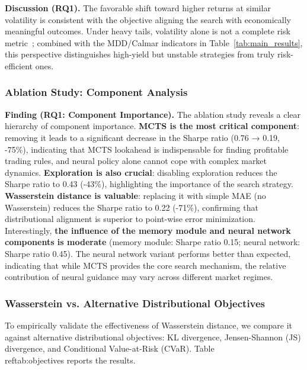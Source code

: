 \textbf{Discussion (RQ1).} The favorable shift toward higher returns at similar volatility is consistent with the objective aligning the search with economically meaningful outcomes. Under heavy tails, volatility alone is not a complete risk metric~\cite{cont2001empirical}; combined with the MDD/Calmar indicators in Table~\ref{tab:main_results}, this perspective distinguishes high-yield but unstable strategies from truly risk-efficient ones.


\subsubsection{Ablation Study: Component Analysis}

\begin{table}[htbp]
\centering
\caption{Ablation Study Results: Performance Metrics by Variant }
\label{tab:ablation_results}

\end{table}

\textbf{Finding (RQ1: Component Importance).} The ablation study reveals a clear hierarchy of component importance. \textbf{MCTS is the most critical component}: removing it leads to a significant decrease in the Sharpe ratio (0.76 → 0.19, -75\%), indicating that MCTS lookahead is indispensable for finding profitable trading rules, and neural policy alone cannot cope with complex market dynamics. \textbf{Exploration is also crucial}: disabling exploration reduces the Sharpe ratio to 0.43 (-43\%), highlighting the importance of the search strategy. \textbf{Wasserstein distance is valuable}: replacing it with simple MAE (no Wasserstein) reduces the Sharpe ratio to 0.22 (-71\%), confirming that distributional alignment is superior to point-wise error minimization. Interestingly, \textbf{the influence of the memory module and neural network components is moderate} (memory module: Sharpe ratio 0.15; neural network: Sharpe ratio 0.45). The neural network variant performs better than expected, indicating that while MCTS provides the core search mechanism, the relative contribution of neural guidance may vary across different market regimes.

\subsubsection{Wasserstein vs. Alternative Distributional Objectives}

To empirically validate the effectiveness of Wasserstein distance, we compare it against alternative distributional objectives: KL divergence, Jensen-Shannon (JS) divergence, and Conditional Value-at-Risk (CVaR). Table~\\ref{tab:objectives} reports the results.

